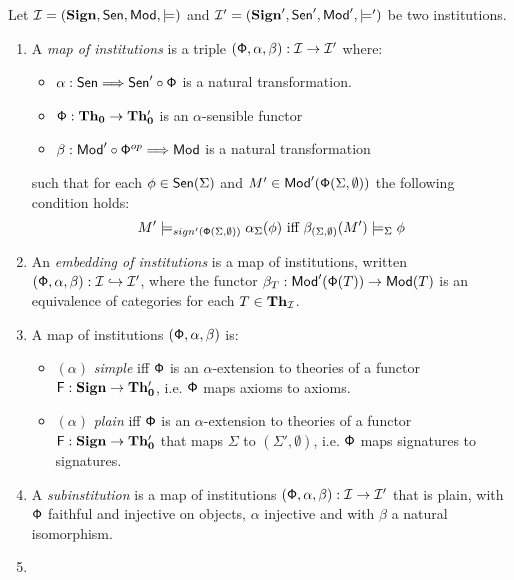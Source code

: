 \documentclass[10pt]{article}
\begin{document}
\begin{definition}\label{de:maps}
Let ${\mathcal{I}}= ({{\bf Sign}},{\sf {Sen}},{\sf {Mod}},\models)$ and
${\mathcal{I'}}=({{\bf Sign}'},{\sf {Sen}}',{\sf {Mod}}',\models')$ be two institutions.
\begin{enumerate}\MyLPar
\item 
A {\em map of institutions} \cite{general} is a triple  $({\sf {\Phi}},\alpha,\beta): {\mathcal{I}} \to {\mathcal{I'}}$ where:
\begin{itemize}\MyLPar
	\item $\alpha: {\sf {Sen}} \mathrel{\Longrightarrow} {\sf {Sen}}' \circ {\sf {\Phi}}$ is a natural transformation.
	\item ${\sf {\Phi}}: {\bf Th_0} \to {\bf Th_0'}$ is an $\alpha$-sensible functor %
\item $\beta: {\sf {Mod}}' \circ {\sf {\Phi}}^{op} \mathrel{\Longrightarrow} {\sf {Mod}}$ is a natural transformation 
\end{itemize}
such that for each $\phi \in {\sf {Sen}}(\Sigma)$ and $ M' \in
{\sf {Mod}}'({\sf {\Phi}}(\Sigma,\emptyset))$ the following condition holds:\vspace*{-1ex}
\[ M' \models_{sign'(\fu{\Phi}(\Sigma,\emptyset))} \alpha_{\Sigma}(\phi)
\mbox{ iff } \beta_{(\Sigma,\emptyset)} (M') \models_{\Sigma} \phi \vspace*{-1ex}\]
\item
An {\em embedding of institutions} \cite{member} is a map of institutions, written
$({\sf {\Phi}},\alpha,\beta): {\mathcal{I}} \hookrightarrow {\mathcal{I'}}$, where the functor $\beta_T
:{\sf {Mod}}'({\sf {\Phi}}(T)) \to {\sf {Mod}}(T)$ is an equivalence of categories for each $T \in
{\bf Th_{{\mathcal{I}}}}$. 
\item
A map of institutions $({\sf {\Phi}},\alpha,\beta)$ is:
	\begin{itemize}\MyLPar
		\item  $(\alpha)$ {\em simple} iff ${\sf {\Phi}}$ is an $\alpha$-extension to theories of a functor ${\sf {F}}:{\bf Sign} \to {\bf Th_0'}$, i.e. ${\sf {\Phi}}$ maps axioms to axioms.
		\item $(\alpha)$ {\em plain} iff ${\sf {\Phi}}$ is an $\alpha$-extension to theories of a functor ${\sf {F}}:{\bf Sign} \to {\bf Th_0'}$ that maps $\Sigma$ to $(\Sigma',\emptyset)$, i.e. ${\sf {\Phi}}$ maps signatures to signatures.
	\end{itemize}
\item
A {\em subinstitution} \cite{general} is a map of institutions
$({\sf {\Phi}},\alpha,\beta):{\mathcal{I}} \to {\mathcal{I}}'$ that is plain, with ${\sf {\Phi}}$
faithful and injective on objects, $\alpha$ injective and with $\beta$ a
natural isomorphism.
\item\label{it:trans}

\end{enumerate}
\end{definition}
\end{document}
